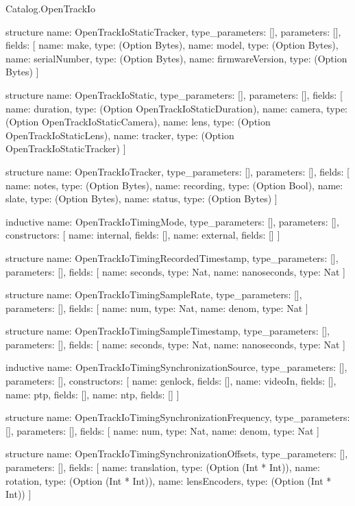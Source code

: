 \begin{lexlean}{Catalog.OpenTrackIo}
\begin{semanticmodule}
structure{
  name: OpenTrackIoStaticTracker,
  type_parameters: [],
  parameters: [],
  fields: [
    {name: make, type: (Option Bytes)},
    {name: model, type: (Option Bytes)},
    {name: serialNumber, type: (Option Bytes)},
    {name: firmwareVersion, type: (Option Bytes)}
  ]
}

structure{
  name: OpenTrackIoStatic,
  type_parameters: [],
  parameters: [],
  fields: [
    {name: duration, type: (Option OpenTrackIoStaticDuration)},
    {name: camera, type: (Option OpenTrackIoStaticCamera)},
    {name: lens, type: (Option OpenTrackIoStaticLens)},
    {name: tracker, type: (Option OpenTrackIoStaticTracker)}
  ]
}

structure{
  name: OpenTrackIoTracker,
  type_parameters: [],
  parameters: [],
  fields: [
    {name: notes, type: (Option Bytes)},
    {name: recording, type: (Option Bool)},
    {name: slate, type: (Option Bytes)},
    {name: status, type: (Option Bytes)}
  ]
}

inductive{
  name: OpenTrackIoTimingMode,
  type_parameters: [],
  parameters: [],
  constructors: [
    {name: internal, fields: []},
    {name: external, fields: []}
  ]
}

structure{
  name: OpenTrackIoTimingRecordedTimestamp,
  type_parameters: [],
  parameters: [],
  fields: [
    {name: seconds, type: Nat},
    {name: nanoseconds, type: Nat}
  ]
}

structure{
  name: OpenTrackIoTimingSampleRate,
  type_parameters: [],
  parameters: [],
  fields: [
    {name: num, type: Nat},
    {name: denom, type: Nat}
  ]
}

structure{
  name: OpenTrackIoTimingSampleTimestamp,
  type_parameters: [],
  parameters: [],
  fields: [
    {name: seconds, type: Nat},
    {name: nanoseconds, type: Nat}
  ]
}

inductive{
  name: OpenTrackIoTimingSynchronizationSource,
  type_parameters: [],
  parameters: [],
  constructors: [
    {name: genlock, fields: []},
    {name: videoIn, fields: []},
    {name: ptp, fields: []},
    {name: ntp, fields: []}
  ]
}

structure{
  name: OpenTrackIoTimingSynchronizationFrequency,
  type_parameters: [],
  parameters: [],
  fields: [
    {name: num, type: Nat},
    {name: denom, type: Nat}
  ]
}

structure{
  name: OpenTrackIoTimingSynchronizationOffsets,
  type_parameters: [],
  parameters: [],
  fields: [
    {name: translation, type: (Option (Int * Int))},
    {name: rotation, type: (Option (Int * Int))},
    {name: lensEncoders, type: (Option (Int * Int))}
  ]
}


\end{semanticmodule}
\end{lexlean}
